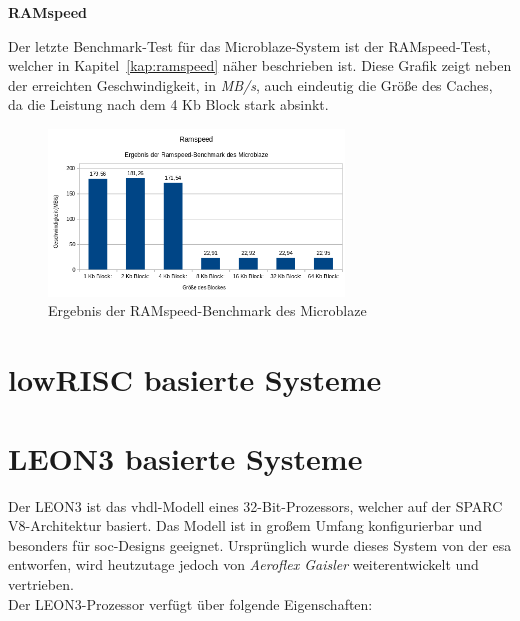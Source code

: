 \textbf{RAMspeed}

Der letzte Benchmark-Test für das Microblaze-System ist der RAMspeed-Test, welcher in Kapitel~\ref{kap:ramspeed} näher beschrieben ist. Diese Grafik zeigt neben der
erreichten Geschwindigkeit, in \emph{MB/s}, auch eindeutig die Größe des Caches, da die Leistung nach dem 4 Kb Block stark absinkt.\\


\begin{figure}[H]
\centering
\includegraphics[width=0.7\textwidth]{Hauptteil/ramspeedmicroblaze.png}
\caption{Ergebnis der RAMspeed-Benchmark des Microblaze}
\label{fig:ramspeedmicroblaze}
\end{figure}



\section{lowRISC basierte Systeme}\label{kap:lowrisc}


\section{LEON3 basierte Systeme}\label{kap:leon3}

Der LEON3 ist das \ac{vhdl}-Modell eines 32-Bit-Prozessors, welcher auf der SPARC V8-Architektur basiert. Das Modell ist in großem Umfang konfigurierbar und besonders für \ac{soc}-Designs geeignet.
Ursprünglich wurde dieses System von der \ac{esa} entworfen, wird heutzutage jedoch von \emph{Aeroflex Gaisler} weiterentwickelt und vertrieben.\\
Der LEON3-Prozessor verfügt über folgende Eigenschaften:\cite{leon}\\


